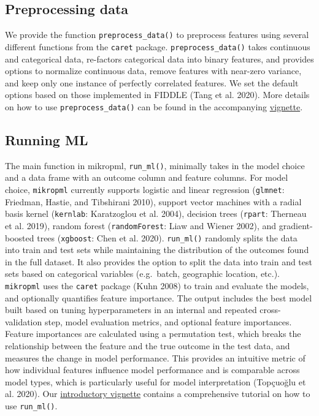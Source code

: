 \documentclass[
]{article}
\begin{document}
\hypertarget{preprocessing-data}{%
\subsection{Preprocessing data}\label{preprocessing-data}}

We provide the function \texttt{preprocess\_data()} to preprocess
features using several different functions from the \texttt{caret}
package. \texttt{preprocess\_data()} takes continuous and categorical
data, re-factors categorical data into binary features, and provides
options to normalize continuous data, remove features with near-zero
variance, and keep only one instance of perfectly correlated features.
We set the default options based on those implemented in FIDDLE (Tang et
al. 2020). More details on how to use \texttt{preprocess\_data()} can be
found in the accompanying
\href{http://www.schlosslab.org/mikropml/articles/preprocess.html}{vignette}.

\hypertarget{running-ml}{%
\subsection{Running ML}\label{running-ml}}

The main function in mikropml, \texttt{run\_ml()}, minimally takes in
the model choice and a data frame with an outcome column and feature
columns. For model choice, \texttt{mikropml} currently supports logistic
and linear regression (\texttt{glmnet}: Friedman, Hastie, and Tibshirani
2010), support vector machines with a radial basis kernel
(\texttt{kernlab}: Karatzoglou et al. 2004), decision trees
(\texttt{rpart}: Therneau et al. 2019), random forest
(\texttt{randomForest}: Liaw and Wiener 2002), and gradient-boosted
trees (\texttt{xgboost}: Chen et al. 2020). \texttt{run\_ml()} randomly
splits the data into train and test sets while maintaining the
distribution of the outcomes found in the full dataset. It also provides
the option to split the data into train and test sets based on
categorical variables (e.g.~batch, geographic location, etc.).
\texttt{mikropml} uses the \texttt{caret} package (Kuhn 2008) to train
and evaluate the models, and optionally quantifies feature importance.
The output includes the best model built based on tuning hyperparameters
in an internal and repeated cross-validation step, model evaluation
metrics, and optional feature importances. Feature importances are
calculated using a permutation test, which breaks the relationship
between the feature and the true outcome in the test data, and measures
the change in model performance. This provides an intuitive metric of
how individual features influence model performance and is comparable
across model types, which is particularly useful for model
interpretation (Topçuoğlu et al. 2020). Our
\href{http://www.schlosslab.org/mikropml/articles/introduction.html}{introductory
vignette} contains a comprehensive tutorial on how to use
\texttt{run\_ml()}.
\end{document}
